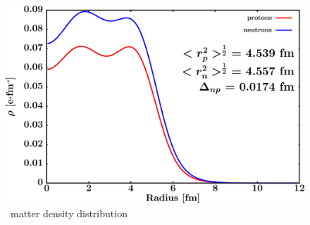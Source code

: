 \begin{figure}[hbtp]
    \centering
    \begin{minipage}{0.70\textwidth}
        \centering
        \includegraphics[width=\linewidth]{figures/sn112_matterDensity.png}
        \caption*{\snTwelve\ matter density distribution}
        \label{DOMFitData_sn112_matterDensity}
    \end{minipage}
\end{figure}

